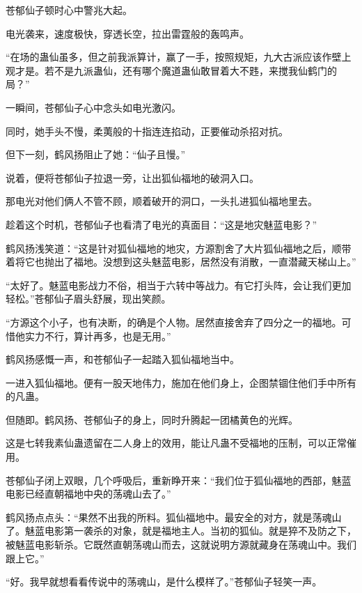 
\begin{this_body}



苍郁仙子顿时心中警兆大起。

电光袭来，速度极快，穿透长空，拉出雷霆般的轰鸣声。

“在场的蛊仙虽多，但之前我派算计，赢了一手，按照规矩，九大古派应该作壁上观才是。若不是九派蛊仙，还有哪个魔道蛊仙敢冒着大不韪，来搅我仙鹤门的局？”

一瞬间，苍郁仙子心中念头如电光激闪。

同时，她手头不慢，柔荑般的十指连连掐动，正要催动杀招对抗。

但下一刻，鹤风扬阻止了她：“仙子且慢。”

说着，便将苍郁仙子拉退一旁，让出狐仙福地的破洞入口。

那电光对他们俩人不管不顾，顺着破开的洞口，一头扎进狐仙福地里去。

趁着这个时机，苍郁仙子也看清了电光的真面目：“这是地灾魅蓝电影？”

鹤风扬浅笑道：“这是针对狐仙福地的地灾，方源割舍了大片狐仙福地之后，顺带着将它也抛出了福地。没想到这头魅蓝电影，居然没有消散，一直潜藏天梯山上。”

“太好了。魅蓝电影战力不俗，相当于六转中等战力。有它打头阵，会让我们更加轻松。”苍郁仙子眉头舒展，现出笑颜。

“方源这个小子，也有决断，的确是个人物。居然直接舍弃了四分之一的福地。可惜他实力不行，算计再多，也是无用。”

鹤风扬感慨一声，和苍郁仙子一起踏入狐仙福地当中。

一进入狐仙福地。便有一股天地伟力，施加在他们身上，企图禁锢住他们手中所有的凡蛊。

但随即。鹤风扬、苍郁仙子的身上，同时升腾起一团橘黄色的光辉。

这是七转我素仙蛊遗留在二人身上的效用，能让凡蛊不受福地的压制，可以正常催用。

苍郁仙子闭上双眼，几个呼吸后，重新睁开来：“我们位于狐仙福地的西部，魅蓝电影已经直朝福地中央的荡魂山去了。”

鹤风扬点点头：“果然不出我的所料。狐仙福地中。最安全的对方，就是荡魂山了。魅蓝电影第一袭杀的对象，就是福地主人。当初的狐仙。就是猝不及防之下，被魅蓝电影斩杀。它既然直朝荡魂山而去，这就说明方源就藏身在荡魂山中。我们跟上它。”

“好。我早就想看看传说中的荡魂山，是什么模样了。”苍郁仙子轻笑一声。


\end{this_body}
